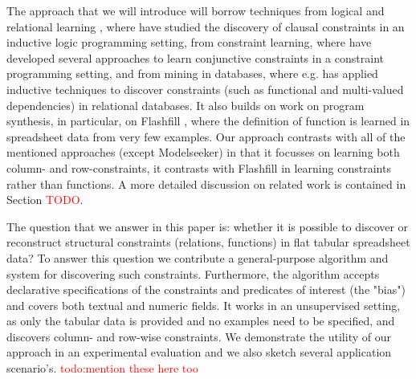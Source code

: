\documentclass{sig-alternate-05-2015}
\newcommand{\tias}[1]{\textcolor{blue}{{\sc Tias:} #1}\xspace}
\newcommand{\luc}[1]{{\textcolor{red}{#1}}}
\begin{document}
The approach that we will introduce will borrow techniques from logical and relational learning \cite{LucBook}, where
\cite{Claudien,todo:lallouet} have studied the discovery of clausal constraints in an inductive logic programming setting, from constraint learning,  where \cite{Quacq,Conacq,Modelseeker} have developed several approaches to learn conjunctive constraints in a constraint programming setting,
and from mining in databases,  where e.g. \cite{Savlik} has applied inductive techniques to discover constraints (such as functional and multi-valued dependencies) in relational databases.  It also builds on work on program synthesis, in particular, on Flashfill \cite{}, where the definition of function is learned in spreadsheet data from
very few examples.  Our approach contrasts with all of the mentioned approaches (except Modelseeker) in that it focusses
on learning both column- and row-constraints, it contrasts with Flashfill in learning constraints rather than functions.
A more detailed discussion on related work is contained in Section \luc{TODO}.






The question that we answer in this paper is: whether it is possible to discover or reconstruct structural constraints (relations, functions) in flat tabular spreadsheet data?
To answer this question we contribute a general-purpose algorithm and system for discovering such constraints. Furthermore, the algorithm accepts declarative specifications of the constraints and predicates of interest (the "bias") and covers both textual and numeric fields. It works in an unsupervised setting, as only the tabular data is provided and no examples need to be specified, and discovers column- and row-wise constraints.
We demonstrate the utility of our approach in an experimental evaluation and we also sketch several application scenario's.
\luc{todo:mention these here too}
\end{document}
